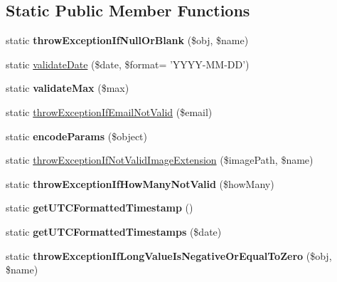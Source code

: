 \subsection*{Static Public Member Functions}
\begin{DoxyCompactItemize}
\item 
\hypertarget{class_util_aed0318e18b5ba31f7100912883beb556}{static {\bfseries throw\+Exception\+If\+Null\+Or\+Blank} (\$obj, \$name)}\label{class_util_aed0318e18b5ba31f7100912883beb556}

\item 
static \hyperlink{class_util_a9494b483ab756dc9b70c6eaea29dc62d}{validate\+Date} (\$date, \$format= 'Y\+Y\+Y\+Y-\/M\+M-\/D\+D')
\item 
\hypertarget{class_util_a6c462f515699699033b67922641f3273}{static {\bfseries validate\+Max} (\$max)}\label{class_util_a6c462f515699699033b67922641f3273}

\item 
static \hyperlink{class_util_a2acd93887ed9df760deb6dadae0e1bc2}{throw\+Exception\+If\+Email\+Not\+Valid} (\$email)
\item 
\hypertarget{class_util_a39bff3577b4794efd90304b5e3ae5dd9}{static {\bfseries encode\+Params} (\$object)}\label{class_util_a39bff3577b4794efd90304b5e3ae5dd9}

\item 
static \hyperlink{class_util_a3450daac414f5bc1bf222640f8ab6079}{throw\+Exception\+If\+Not\+Valid\+Image\+Extension} (\$image\+Path, \$name)
\item 
\hypertarget{class_util_ad509cd3200204c988b12f93822df19a1}{static {\bfseries throw\+Exception\+If\+How\+Many\+Not\+Valid} (\$how\+Many)}\label{class_util_ad509cd3200204c988b12f93822df19a1}

\item 
\hypertarget{class_util_a517f121e47b1c7fc4738599e29ece725}{static {\bfseries get\+U\+T\+C\+Formatted\+Timestamp} ()}\label{class_util_a517f121e47b1c7fc4738599e29ece725}

\item 
\hypertarget{class_util_a63a3a4b8f9a5cdb3755fdc3e2724ea97}{static {\bfseries get\+U\+T\+C\+Formatted\+Timestamps} (\$date)}\label{class_util_a63a3a4b8f9a5cdb3755fdc3e2724ea97}

\item 
\hypertarget{class_util_a1468a1168693d0951e9a69d52ab13b73}{static {\bfseries throw\+Exception\+If\+Long\+Value\+Is\+Negative\+Or\+Equal\+To\+Zero} (\$obj, \$name)}\label{class_util_a1468a1168693d0951e9a69d52ab13b73}

\end{DoxyCompactItemize}



